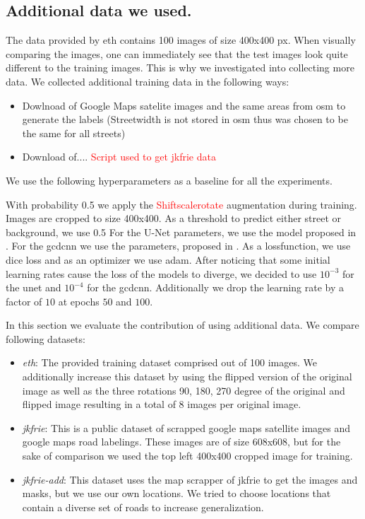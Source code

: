\subsection{Additional data we used.}
The data provided by \acrshort{eth} contains 100 images of size 400x400 px. When visually comparing the images, one can immediately see that the test images look quite different to the training images. This is why we investigated into collecting more data. We collected additional training data in the following ways:
\begin{itemize}
    \item Dowlnoad of Google Maps satelite images and the same areas from \acrfull{osm} to generate the labels (Streetwidth is not stored in \acrshort{osm} thus was chosen to be the same for all streets)
    \item Download of.... \textcolor{red}{Script used to get jkfrie data}
\end{itemize}


We use the following hyperparameters as a baseline for all the experiments.

 With probability 0.5 we apply the \textcolor{red}{Shiftscalerotate} augmentation during training. Images are cropped to size 400x400. As a threshold to predict either street or background, we use 0.5 
For the U-Net parameters, we use the model proposed in \cite{unet}. For the \acrshort{gcdcnn} we use the parameters, proposed in \textcolor{red}{\cite{gcdcnn}}. As a lossfunction, we use dice loss \cite{dicelosspaper} and as an optimizer we use adam. After noticing that some initial learning rates cause the loss of the models to diverge, we decided to use $10^{-3}$ for the unet and $10^{-4}$ for the \acrshort{gcdcnn}. Additionally we drop the learning rate by a factor of $10$ at epochs $50$ and $100$. 

In this section we evaluate the contribution of using additional data.
We compare following datasets:
\begin{itemize}
    \item \emph{\acrshort{eth}}: The provided training dataset comprised out of 100 images. We additionally increase this dataset by using the flipped version of the original image as well as the three rotations 90, 180, 270 degree of the original and flipped image resulting in a total of 8 images per original image.
    \item \emph{jkfrie}: This is a public dataset of scrapped google maps satellite images and google maps road labelings. These images are of size 608x608, but for the sake of comparison we used the top left 400x400 cropped image for training.
    \item \emph{jkfrie-add}: This dataset uses the map scrapper of jkfrie to get the images and masks, but we use our own locations. We tried to choose locations that contain a diverse set of roads to increase generalization.
\end{itemize}

